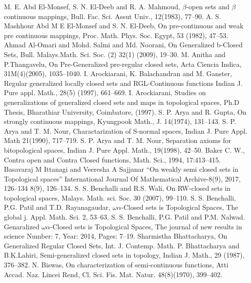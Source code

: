 \begin{thebibliography}{99}
 M. E. Abd El-Monsef, S. N. El-Deeb and R. A. Mahmoud, $\beta$-open sets and $\beta$ continuous mappings, Bull. Fac. Sci. Assut Univ., 12(1983), 77--90.
 A. S. Mashhour Abd M E El-Monsef and S. N. El-Deeb, On pre-continuous and weak pre continuous mappings, Proc. Math. Phys. Soc. Egypt, 53 (1982), 47--53.
 Ahmad Al-Omari and Mohd. Salmi and Md. Noorani, On Generalized b-Closed Sets, Bull. Malays.Math. Sci. Soc. (2) 32(1) (2009), 19--30.
 M. Anitha and P.Thangavelu, On Pre-Generalized pre-regular closed sets, Acta Ciencia Indica, 31M(4)(2005), 1035--1040.
 I. Arockiarani, K. Balachandran and M. Ganster, Regular generalized locally closed sets and RGL-Continuous functions Indian J. Pure appl. Math., 28(5) (1997), 661--669.
 I. Arockiarani, Studies on generalizations of generalized closed sets and maps in topological spaces, Ph.D Thesis, Bharathiar University, Coimbatore, (1997).
 S. P. Arya and R. Gupta, On strongly continuous mappings, Kyungpook Math., J. 14(1974), 131--143.
 S. P. Arya and T. M. Nour, Charactarization of S-normal spaces, Indian J. Pure Appl. Math  21(1990), 717--719.
 S. P. Arya and T. M. Nour, Separation axioms for bitopological spaces, Indian J. Pure Appl. Math., 19(1998), 42--50.
 Baker C. W., Contra open and Contra Closed functions, Math. Sci., 1994, 17:413--415.
 Basavaraj M Ittanagi and Veeresha A Sajjanar ``On weakly semi closed sets in Topological spaces''  International Journal Of Mathematical Archive-8(9), 2017, 126--134 8(9), 126--134.
 S. S. Benchalli and R.S. Wali, On RW-closed sets in topological spaces, Malays. Math. sci. Soc. 30 (2007), 99--110.
 S. S. Benchalli, P.G. Patil and T.D. Rayanagaudar, $\omega\alpha$-Closed sets is Topological Spaces, The global j. Appl. Math. Sci. 2, 53--63.
 S. S. Benchalli, P.G. Patil and P.M. Nalwad. Genaralized  $\omega\alpha$-Closed sets is Topological Spaces, The journal of new results in science Number: 7, Year: 2014, Pages: 7--19.
 Sharmistha Bhattacharya, On Generalized Regular Closed Sets, Int. J. Contemp. Math.  
	P. Bhattacharya and B.K.Lahiri, Semi-generalized closed sets in topology, Indian J. Math., 29 	(1987), 376--382.
 N. Biswas, On characterization of semi-continuous functions, Atti Accad. Naz. Lincei Rend, Cl. Sci. Fis. Mat. Natur. 48(8)(1970), 399--402.

\end{thebibliography}
